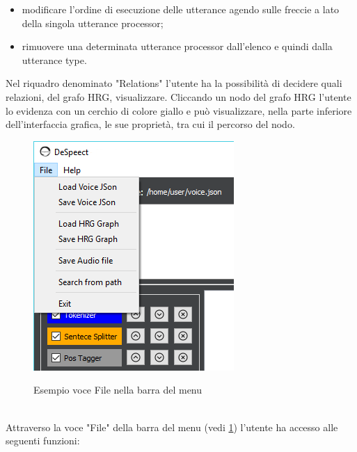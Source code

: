 \documentclass[../AnalisideiRequisiti.tex]{subfiles}
\begin{document}
		\begin{itemize}
			\item{}modificare l'ordine di esecuzione delle utterance agendo sulle freccie a lato della singola utterance processor;
			\item{}rimuovere una determinata utterance processor dall'elenco e quindi dalla utterance type.
		\end{itemize}
		Nel riquadro denominato "Relations" l'utente ha la possibilità di decidere quali relazioni, del grafo HRG, visualizzare. Cliccando un nodo del grafo HRG l'utente lo evidenza con un cerchio di colore giallo e può visualizzare, nella parte inferiore dell'interfaccia grafica, le sue proprietà, tra cui il percorso del nodo.
	\begin{figure}[htp]
	\caption{Esempio voce File nella barra del menu}
	\centering
	\includegraphics[]{../img/menu-file.png}
	\label{fig:menufile}
\end{figure}
	\\ Attraverso la voce "File" della barra del menu (vedi \ref{fig:menufile}) l'utente ha accesso alle seguenti funzioni:
	 	
\end{document}

